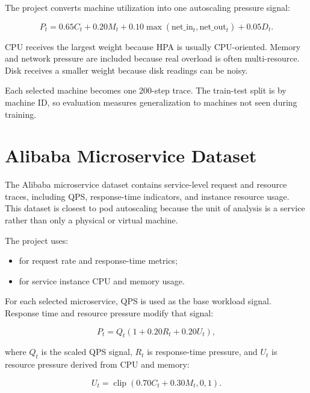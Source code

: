 \documentclass{rapportINPTCLOUD}
\newcommand{\pathcode}[1]{\texttt{\detokenize{#1}}}
\begin{document}
The project converts machine utilization into one autoscaling pressure signal:

\begin{equation}
P_t =
0.65 C_t
+ 0.20 M_t
+ 0.10 \max(\text{net\_in}_t,\text{net\_out}_t)
+ 0.05 D_t.
\label{eq:alibaba-machine}
\end{equation}

CPU receives the largest weight because HPA is usually CPU-oriented. Memory and network pressure are included because real overload is often multi-resource. Disk receives a smaller weight because disk readings can be noisy.

Each selected machine becomes one 200-step trace. The train-test split is by machine ID, so evaluation measures generalization to machines not seen during training.

\section{Alibaba Microservice Dataset}

The Alibaba microservice dataset contains service-level request and resource traces, including QPS, response-time indicators, and instance resource usage. This dataset is closest to pod autoscaling because the unit of analysis is a service rather than only a physical or virtual machine.

The project uses:

\begin{itemize}
  \item \pathcode{MSRTQps_0.csv} for request rate and response-time metrics;
  \item \pathcode{MSResource_0.csv} for service instance CPU and memory usage.
\end{itemize}

For each selected microservice, QPS is used as the base workload signal. Response time and resource pressure modify that signal:

\begin{equation}
P_t =
Q_t
\left(
1
+ 0.20 R_t
+ 0.20 U_t
\right),
\label{eq:alibaba-micro}
\end{equation}

where $Q_t$ is the scaled QPS signal, $R_t$ is response-time pressure, and $U_t$ is resource pressure derived from CPU and memory:

\begin{equation}
U_t =
\operatorname{clip}
\left(
0.70 C_t + 0.30 M_t,
0,
1
\right).
\end{equation}
\end{document}
